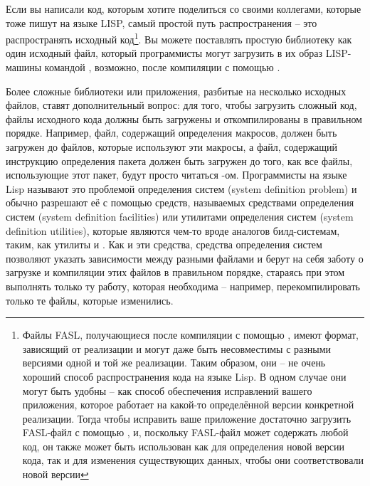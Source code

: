 Если вы написали код, которым хотите поделиться со своими коллегами, которые тоже пишут на
языке LISP, самый простой путь распространения -- это распространять исходный
код\footnote{Файлы FASL, получающиеся после компиляции с помощью ,
  имеют формат, зависящий от реализации и могут даже быть несовместимы с разными версиями
  одной и той же реализации. Таким образом, они -- не очень хороший способ распространения
  кода на языке Lisp. В одном случае они могут быть удобны -- как способ обеспечения
  исправлений вашего приложения, которое работает на какой-то определённой версии
  конкретной реализации. Тогда чтобы исправить ваше приложение достаточно загрузить
  FASL-файл с помощью , и, поскольку FASL-файл может содержать любой код, он
  также может быть использован как для определения новой версии кода, так и для изменения
  существующих данных, чтобы они соответствовали новой версии}. Вы можете поставлять
простую библиотеку как один исходный файл, который программисты могут загрузить в их образ
LISP-машины командой , возможно, после компиляции с помощью
.

Более сложные библиотеки или приложения, разбитые на несколько исходных файлов, ставят
дополнительный вопрос: для того, чтобы загрузить сложный код, файлы исходного кода должны
быть загружены и откомпилированы в правильном порядке. Например, файл, содержащий
определения макросов, должен быть загружен до файлов, которые используют эти макросы, а
файл, содержащий инструкцию определения пакета  должен быть загружен до
того, как все файлы, использующие этот пакет, будут просто читаться
-ом. Программисты на языке Lisp называют это проблемой определения систем
(system definition problem) и обычно разрешают её с помощью средств, называемых средствами
определения систем (system definition facilities) или утилитами определения систем (system
definition utilities), которые являются чем-то вроде аналогов билд-системам, таким, как
утилиты  и . Как и эти средства, средства определения систем
позволяют указать зависимости между разными файлами и берут на себя заботу о загрузке и
компиляции этих файлов в правильном порядке, стараясь при этом выполнять только ту работу,
которая необходима -- например, перекомпилировать только те файлы, которые изменились.

